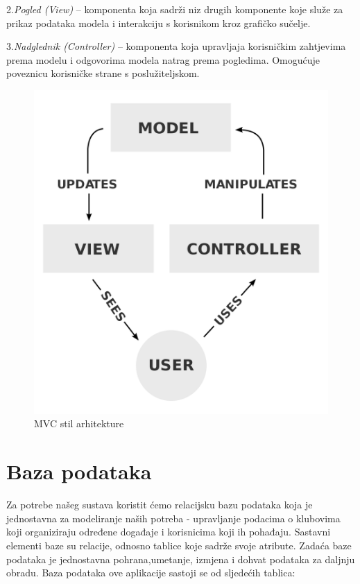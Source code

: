 \begin{itemize}
2.\textit{Pogled (View)} – komponenta koja sadrži niz drugih komponente koje služe za prikaz podataka modela i interakciju s korisnikom kroz grafičko sučelje.

3.\textit{Nadglednik (Controller)}  – komponenta koja upravljaja korisničkim zahtjevima prema modelu i odgovorima modela natrag prema pogledima. Omogućuje poveznicu korisničke strane s poslužiteljskom.

		\begin{figure}[H]
			\includegraphics[scale=0.1]{slike/mvc.PNG} %
			\centering
			\caption{MVC stil arhitekture}
			\label{fig:mvc}
		\end{figure}
	

	\end{itemize}


		
		\section{Baza podataka}

		Za potrebe našeg sustava koristit ćemo relacijsku bazu podataka koja je jednostavna za modeliranje naših potreba - upravljanje podacima o klubovima koji organiziraju određene događaje i korisnicima koji ih pohađaju. Sastavni elementi baze su relacije, odnosno tablice koje sadrže svoje atribute. Zadaća baze podataka je jednostavna pohrana,umetanje, izmjena i dohvat podataka za daljnju obradu. Baza podataka ove aplikacije sastoji se od sljedećih tablica:

